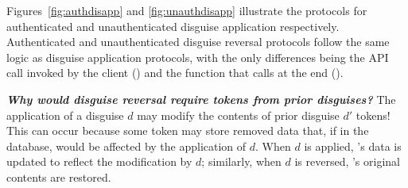 Figures~\ref{fig:authdisapp} and \ref{fig:unauthdisapp} illustrate the protocols for authenticated
and unauthenticated disguise application respectively. Authenticated and unauthenticated disguise
reversal protocols follow the same logic as disguise application protocols, with the only
differences being the API call invoked by the client () and the
function that \sys calls at the end ().

\vspace{6pt}\noindent\textbf{\emph{Why would disguise reversal require tokens from prior disguises?}} 
The application of a disguise $d$ may modify the contents of prior disguise $d'$ tokens!
This can occur because some token \tdata{} may store removed data that, if in the database, would be
affected by the application of $d$. When $d$ is applied, \tdata{}'s data is updated to reflect the
modification by $d$; similarly, when $d$ is reversed, \tdata{}'s original contents are restored.

